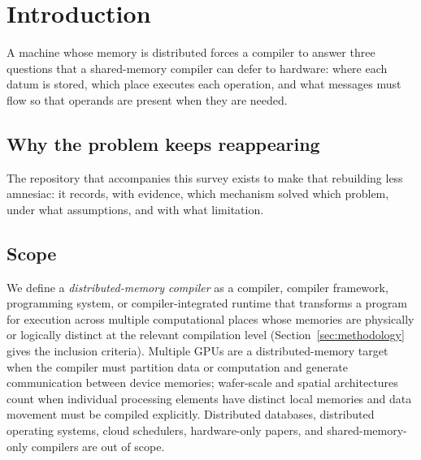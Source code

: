 \section{Introduction}
\label{sec:introduction}

A machine whose memory is distributed forces a compiler to answer three questions that a shared-memory compiler can defer to hardware: where each datum is stored, which place executes each operation, and what messages must flow so that operands are present when they are needed.   

\subsection{Why the problem keeps reappearing}
 The repository that accompanies this survey exists to make that rebuilding less amnesiac: it records, with evidence, which mechanism solved which problem, under what assumptions, and with what limitation.

\subsection{Scope}
We define a \emph{distributed-memory compiler} as a compiler, compiler framework, programming system, or compiler-integrated runtime that transforms a program for execution across multiple computational places whose memories are physically or logically distinct at the relevant compilation level (Section~\ref{sec:methodology} gives the inclusion criteria). Multiple GPUs are a distributed-memory target when the compiler must partition data or computation and generate communication between device memories; wafer-scale and spatial architectures count when individual processing elements have distinct local memories and data movement must be compiled explicitly. Distributed databases, distributed operating systems, cloud schedulers, hardware-only papers, and shared-memory-only compilers are out of scope.

